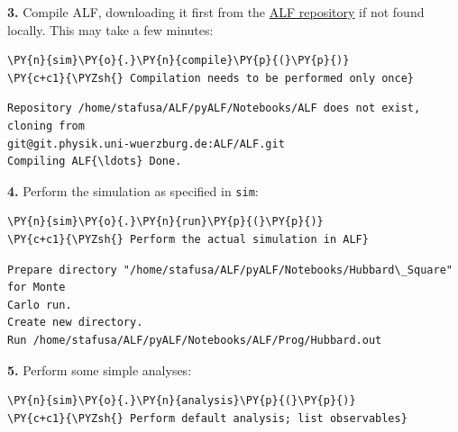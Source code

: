     \textbf{3.} Compile ALF, downloading it first from the
\href{https://git.physik.uni-wuerzburg.de:ALF}{ALF repository} if not
found locally. This may take a few minutes:

    \begin{tcolorbox}[breakable, size=fbox, boxrule=1pt, pad at break*=1mm,colback=cellbackground, colframe=cellborder]
\begin{Verbatim}[commandchars=\\\{\}]
\PY{n}{sim}\PY{o}{.}\PY{n}{compile}\PY{p}{(}\PY{p}{)}                            \PY{c+c1}{\PYZsh{} Compilation needs to be performed only once}
\end{Verbatim}
\end{tcolorbox}

    \begin{Verbatim}[commandchars=\\\{\}]
Repository /home/stafusa/ALF/pyALF/Notebooks/ALF does not exist, cloning from
git@git.physik.uni-wuerzburg.de:ALF/ALF.git
Compiling ALF{\ldots} Done.
    \end{Verbatim}

    \textbf{4.} Perform the simulation as specified in \texttt{sim}:

    \begin{tcolorbox}[breakable, size=fbox, boxrule=1pt, pad at break*=1mm,colback=cellbackground, colframe=cellborder]
\begin{Verbatim}[commandchars=\\\{\}]
\PY{n}{sim}\PY{o}{.}\PY{n}{run}\PY{p}{(}\PY{p}{)}                                \PY{c+c1}{\PYZsh{} Perform the actual simulation in ALF}
\end{Verbatim}
\end{tcolorbox}

    \begin{Verbatim}[commandchars=\\\{\}]
Prepare directory "/home/stafusa/ALF/pyALF/Notebooks/Hubbard\_Square" for Monte
Carlo run.
Create new directory.
Run /home/stafusa/ALF/pyALF/Notebooks/ALF/Prog/Hubbard.out
    \end{Verbatim}

    \textbf{5.} Perform some simple analyses:

    \begin{tcolorbox}[breakable, size=fbox, boxrule=1pt, pad at break*=1mm,colback=cellbackground, colframe=cellborder]
\begin{Verbatim}[commandchars=\\\{\}]
\PY{n}{sim}\PY{o}{.}\PY{n}{analysis}\PY{p}{(}\PY{p}{)}                           \PY{c+c1}{\PYZsh{} Perform default analysis; list observables}
\end{Verbatim}
\end{tcolorbox}

